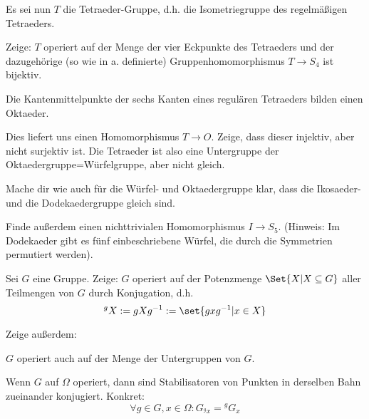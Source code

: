 \begin{sheet}
\begin{problem}[title={Gruppenhomomorphismen}]
Es sei nun $T$ die Tetraeder-Gruppe, d.h. die Isometriegruppe des regelmäßigen Tetraeders. 
\begin{subproblem}
Zeige: $T$ operiert auf der Menge der vier Eckpunkte des Tetraeders und der dazugehörige (so wie in a. definierte) Gruppenhomomorphismus $T\to S_4$ ist bijektiv.
\end{subproblem}
\begin{subproblem}
Die Kantenmittelpunkte der sechs Kanten eines regulären Tetraeders bilden einen Oktaeder.


Dies liefert uns einen Homomorphismus $T\to O$. Zeige, dass dieser injektiv, aber nicht surjektiv ist. Die Tetraeder ist also eine Untergruppe der Oktaedergruppe=Würfelgruppe, aber nicht gleich.
\end{subproblem}

\begin{subproblem}[difficulty={mittel bis schwer}]
Mache dir wie auch für die Würfel- und Oktaedergruppe klar, dass die Ikosaeder- und die Dodekaedergruppe gleich sind.

Finde außerdem einen nichttrivialen Homomorphismus $I\to S_5$. (Hinweis: Im Dodekaeder gibt es fünf einbeschriebene Würfel, die durch die Symmetrien permutiert werden).
\end{subproblem}
\end{problem}


\begin{problem}[title={Operation auf Teilmengen durch Konjugation}]
Sei $G$ eine Gruppe. Zeige: $G$ operiert auf der Potenzmenge $\Set{X | X\subseteq G}$ aller Teilmengen von $G$ durch Konjugation, d.h.
\[{^g X} := gXg^{-1} := \set{gxg^{-1} | x\in X}\]

Zeige außerdem:
\begin{subproblem}
$G$ operiert auch auf der Menge der Untergruppen von $G$.
\end{subproblem}
\begin{subproblem}
Wenn $G$ auf $\Omega$ operiert, dann sind Stabilisatoren von Punkten in derselben Bahn zueinander konjugiert. Konkret:
\[\forall g\in G, x\in\Omega: G_{^g x} = {^g G_x}\]
\end{subproblem}


\end{problem}
\end{sheet}
